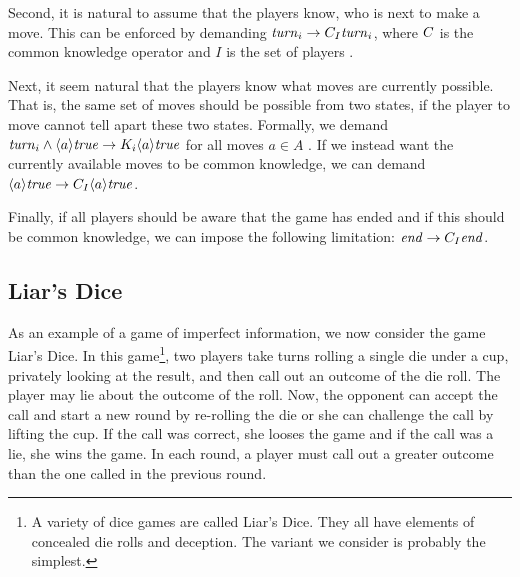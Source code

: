 Second, it is natural to assume that the players know, who is next to make a move. This can be enforced by demanding $ \mathit{turn}_{i} \rightarrow C_{I} \mathit{turn}_{i} $, where $ C $ is the common knowledge operator and $ I $ is the set of players \cite{benthem2001a}.

Next, it seem natural that the players know what moves are currently possible. That is, the same set of moves should be possible from two states, if the player to move cannot tell apart these two states. Formally, we demand $ \mathit{turn}_{i} \wedge \langle a \rangle \mathit{true} \rightarrow K_{i} \langle a \rangle \mathit{true} $ for all moves $ a \in A $ \cite{benthem2001a}. If we instead want the currently available moves to be common knowledge, we can demand $ \langle a \rangle \mathit{true} \rightarrow C_{I} \langle a \rangle \mathit{true} $.

Finally, if all players should be aware that the game has ended and if this should be common knowledge, we can impose the following limitation: $ \mathit{end} \rightarrow C_{I} \mathit{end} $.




\subsection{Liar's Dice} \label{sec:liars-dice}

As an example of a game of imperfect information, we now consider the game Liar's Dice. In this game\footnote{A variety of dice games are called Liar's Dice. They all have elements of concealed die rolls and deception. The variant we consider is probably the simplest.}, two players take turns rolling a single die under a cup, privately looking at the result, and then call out an outcome of the die roll. The player may lie about the outcome of the roll. Now, the opponent can accept the call and start a new round by re-rolling the die or she can challenge the call by lifting the cup. If the call was correct, she looses the game and if the call was a lie, she wins the game. In each round, a player must call out a greater outcome than the one called in the previous round.

